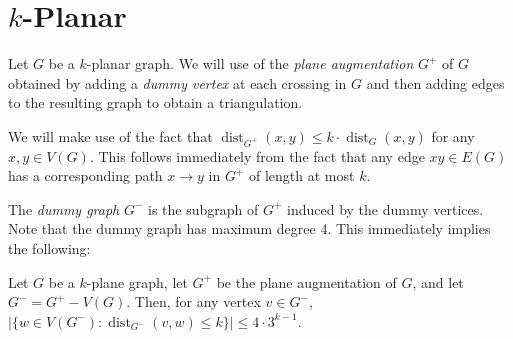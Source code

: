 \documentclass{patmorin}
\DeclareMathOperator{\dist}{dist}
\begin{document}
% 
% 
% 
% 


\section{$k$-Planar}

Let $G$ be a $k$-planar graph.  We will use of the \emph{plane augmentation} $G^+$ of $G$ obtained by adding a \emph{dummy vertex} at each crossing in $G$
and then adding edges to the resulting graph to obtain a triangulation.
% 
% 
% 

We will make use of the fact that $\dist_{G^+}(x,y)\le k\cdot\dist_G(x,y)$ for any $x,y\in V(G)$.  This follows immediately from the fact that any edge $xy\in E(G)$ has a corresponding path $x\to y$ in $G^+$ of length at most $k$.  

The \emph{dummy graph} $G^-$ is the subgraph of $G^+$ induced by the dummy vertices.  Note that the dummy graph has maximum degree 4. This immediately implies the following:

\begin{lem}
  Let $G$ be a $k$-plane graph, let $G^+$ be the plane augmentation of $G$, and let $G^-=G^+-V(G)$.  Then, for any vertex $v\in G^-$, $|\{w\in V(G^-): \dist_{G^-}(v,w)\le k\}|\le 4\cdot 3^{k-1}$.
\end{lem}
\end{document}
